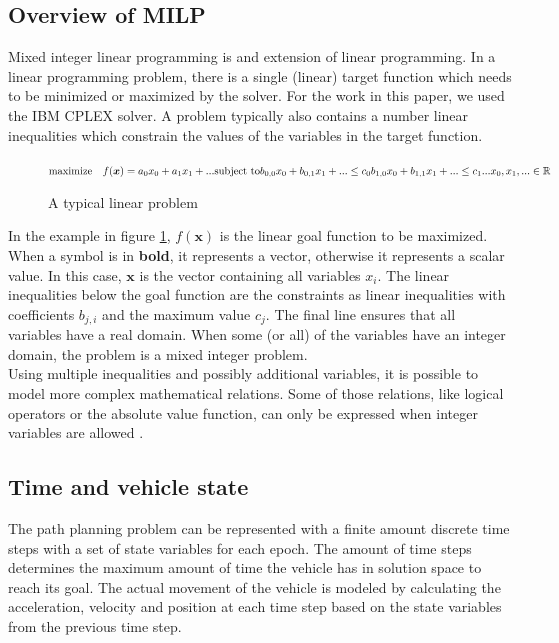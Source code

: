 \subsection{Overview of MILP}
\label{subsec:previous}
Mixed integer linear programming is and extension of linear programming. In a linear programming problem, there is a single (linear) target function which needs to be minimized or maximized by the solver. For the work in this paper, we used the IBM CPLEX solver. A problem typically also contains a number linear inequalities which constrain the values of the variables in the target function. \\
\begin{figure}
\begin{math}
\text{maximize} \quad f(\boldsymbol{x}) = a_0 x_0 + a_1 x_1 + ...\\
\text{subject to} \\
b_{0,0} x_0 + b_{0,1} x_1 + ...\leq c_0 \\
b_{1,0} x_0 + b_{1,1} x_1 + ...\leq c_1 \\
... \\
x_0, x_1, ... \in \mathbb{R}
\end{math}
\caption{A typical linear problem}
\label{fig:example-lp}
\end{figure}
In the example in figure \ref{fig:example-lp}, $  f(\boldsymbol{x}) $ is the linear goal function to be maximized. When a symbol is in \textbf{bold}, it represents a vector, otherwise it represents a scalar value. In this case, $\boldsymbol{x}$ is the vector containing all variables $x_i$. The linear inequalities below the goal function are the constraints as linear inequalities with coefficients $b_{j,i}$ and the maximum value $c_j$. The final line ensures that all variables have a real domain. When some (or all) of the variables have an integer domain, the problem is a mixed integer problem. \\
Using multiple inequalities and possibly additional variables, it is possible to model more complex mathematical relations. Some of those relations, like logical operators or the absolute value function, can only be expressed when integer variables are allowed \cite{Mitra1994}. 
\subsection{Time and vehicle state}
\label{section:modeling}

The path planning problem can be represented with a finite amount discrete time steps with a set of state variables for each epoch. The amount of time steps determines the maximum amount of time the vehicle has in solution space to reach its goal. The actual movement of the vehicle is modeled by calculating the acceleration, velocity and position at each time step based on the state variables from the previous time step.

